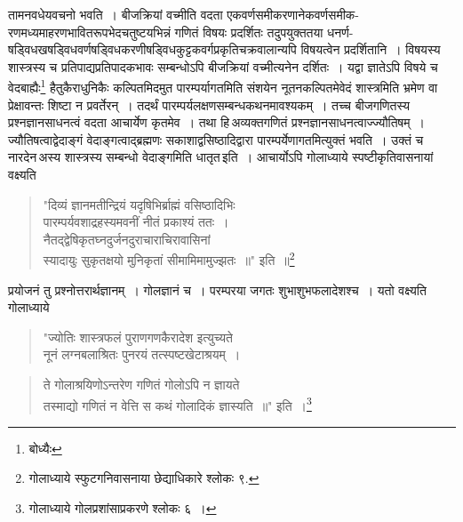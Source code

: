 \documentclass[11pt, openany]{book}
\begin{document}
\noindent तामनवधेयवचनो भवति~। बीजक्रियां वच्मीति वदता एकवर्णसमीकरणानेकवर्णसमीक-रणमध्यमाहरणभावितरूपभेदचतुष्टयभिन्नं गणितं विषयः प्रदर्शितः तदुपयुक्ततया धनर्ण-षड्विधखषड्विधवर्णषड्विधकरणीषड्विधकुट्टकवर्गप्रकृतिचक्रवालान्यपि विषयत्वेन प्रदर्शितानि~। विषयस्य शास्त्रस्य च
प्रतिपाद्यप्रतिपादकभावः सम्बन्धोऽपि बीजक्रियां वच्मीत्यनेन दर्शितः~। यद्वा ज्ञातेऽपि 
विषये च वेदबाह्यैः\renewcommand{\thefootnote}{*}\footnote{बोध्यैः} हैतुकैराधुनिकैः कल्पितमिदमुत पारम्पर्यागतमिति 
संशयेन नूतनकल्पितमेवेदं शास्त्रमिति भ्रमेण वा प्रेक्षावन्तः शिष्टा न 
प्रवर्तेरन्~। तदर्थं पारम्पर्यलक्षणसम्बन्धकथनमावश्यकम्~। तच्च बीजगणितस्य
प्रश्नज्ञानसाधनत्वं वदता आचार्येण कृतमेव~। तथा हि\textendash \,अव्यक्तगणितं प्रश्नज्ञानसाधनत्वाज्ज्यौतिषम्~। ज्यौतिषत्वाद्वेदाङ्गं
वेदाङ्गत्वाद्ब्रह्मणः सकाशाद्वसिष्ठादिद्वारा पारम्पर्येणागतमित्युक्तं भवति~। उक्तं च नारदेन\textendash \,अस्य शास्त्रस्य सम्बन्धो वेदाङ्गमिति धातृत\textendash \,इति~। आचार्योऽपि {\qt गोलाध्याये} स्पष्टीकृतिवासनायां वक्ष्यति\textendash  
\begin{quote}
    {\qt
\hspace{-3mm} "दिव्यं ज्ञानमतीन्द्रियं यदृषिभिर्ब्राह्मं वसिष्ठादिभिः \\

\vspace{-7mm}
 \hspace{0.6cm} पारम्पर्यवशाद्रहस्यमवनीं नीतं प्रकाश्यं ततः~। \\

\vspace{-7mm}
 \hspace{-1.5mm} नैतद्द्वेषिकृतघ्नदुर्जनदुराचाराचिरावासिनां \\

\vspace{-7mm}
\hspace{0.6cm} स्यादायुः सुकृतक्षयो मुनिकृतां सीमामिमामुज्झतः~॥"} इति~॥\renewcommand{\thefootnote}{$\dag$}\footnote{गोलाध्याये स्फुटगनिवासनाया छेद्याधिकारे श्लोकः ९.}
\end{quote}


 प्रयोजनं तु प्रश्नोत्तरार्थज्ञानम्~। गोलज्ञानं च~। परम्परया जगतः 
शुभाशुभफलादेशश्च~। यतो वक्ष्यति {\qt गोलाध्याये\textendash }
\begin{quote}
    \qt
 "ज्योतिः शास्त्रफलं पुराणगणकैरादेश इत्युच्यते \\

\vspace{-7mm}
\hspace{0.5cm} नूनं लग्नबलाश्रितः पुनरयं तत्स्पष्टखेटाश्रयम्~। \\
\end{quote}
\newpage%
\begin{quote}
    {\qt
 ते गोलाश्रयिणोऽन्तरेण गणितं गोलोऽपि न ज्ञायते \\

\vspace{-7mm}
\hspace{0.5cm} तस्माद्यो गणितं न वेत्ति स कथं गोलादिकं ज्ञास्यति~॥"} इति~।\renewcommand{\thefootnote}{*}\footnote{गोलाध्याये गोलप्रशांसाप्रकरणे श्लोकः ६~।}
\end{quote}
\end{document}
